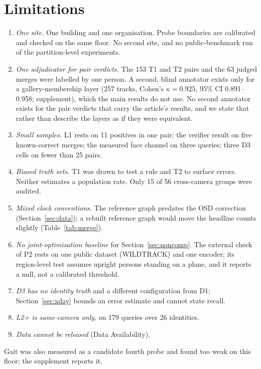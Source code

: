 \documentclass[journal]{IEEEtran}
\begin{document}
\section{Limitations}\label{sec:limits}
\begin{enumerate}
\item \emph{One site.} One building and one organisation. Probe boundaries are calibrated and checked on the same floor. No second site, and no public-benchmark run of the partition-level experiments.
\item \emph{One adjudicator for pair verdicts.} The 153 T1 and T2 pairs and the 63 judged merges were labelled by one person. A second, blind annotator exists only for a gallery-membership layer (257 tracks, Cohen's $\kappa = 0.925$, 95\% CI 0.891--0.958; supplement), which the main results do not use. No second annotator exists for the pair verdicts that carry the article's results, and we state that rather than describe the layers as if they were equivalent.
\item \emph{Small samples.} L1 rests on 11 positives in one pair; the verifier result on five known-correct merges; the measured face channel on three queries; three D3 cells on fewer than 25 pairs.
\item \emph{Biased truth sets.} T1 was drawn to test a rule and T2 to surface errors. Neither estimates a population rate. Only 15 of 56 cross-camera groups were audited.
\item \emph{Mixed clock conventions.} The reference graph predates the OSD correction (Section~\ref{sec:data}); a rebuilt reference graph would move the headline counts slightly (Table~\ref{tab:merge}).
\item \emph{No joint-optimisation baseline} for Section~\ref{sec:noncomp}. The external check of P2 rests on one public dataset (WILDTRACK) and one encoder; its region-level test assumes upright persons standing on a plane, and it reports a null, not a calibrated threshold.
\item \emph{D3 has no identity truth} and a different configuration from D1; Section~\ref{sec:xday} bounds an error estimate and cannot state recall.
\item \emph{L2+ is same-camera only}, on 179 queries over 26 identities.
\item \emph{Data cannot be released} (Data Availability).
\end{enumerate}
Gait was also measured as a candidate fourth probe and found too weak on this floor; the supplement reports it.
\end{document}
